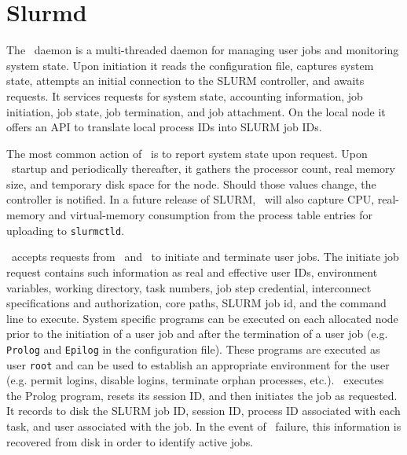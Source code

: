 \documentclass[10pt,onecolumn,times]{../common/llncs}
\begin{document}
{\section{Slurmd}

The \slurmd\ daemon is a multi-threaded daemon for managing user jobs
and monitoring system state.  Upon initiation it reads the configuration
file, captures system state, attempts an initial connection to the SLURM
controller, and awaits requests.  It services requests for system state,
accounting information, job initiation, job state, job termination,
and job attachment. On the local node it offers an API to translate
local process IDs into SLURM job IDs.

The most common action of \slurmd\ is to report system state upon request.
Upon \slurmd\ startup and periodically thereafter, it gathers the
processor count, real memory size, and temporary disk space for the
node. Should those values change, the controller is notified.  In a
future release of SLURM, \slurmd\ will also capture CPU, real-memory and
virtual-memory consumption from the process table entries for uploading
to {\tt slurmctld}.


\slurmd\ accepts requests from \srun\ and \slurmctld\ to initiate
and terminate user jobs. The initiate job request contains such
information as real and effective user IDs, environment variables, working
directory, task numbers, job step credential, interconnect specifications and
authorization, core paths, SLURM job id, and the command line to execute.
System specific programs can be executed on each allocated node prior
to the initiation of a user job and after the termination of a user
job (e.g. {\tt Prolog} and {\tt Epilog} in the configuration file).
These programs are executed as user {\tt root} and can be used to
establish an appropriate environment for the user (e.g. permit logins,
disable logins, terminate orphan processes, etc.).  \slurmd\ executes
the Prolog program, resets its session ID, and then initiates the job
as requested. It records to disk the SLURM job ID, session ID, process
ID associated with each task, and user associated with the job.  In the
event of \slurmd\ failure, this information is recovered from disk in
order to identify active jobs.

}
\end{document}
